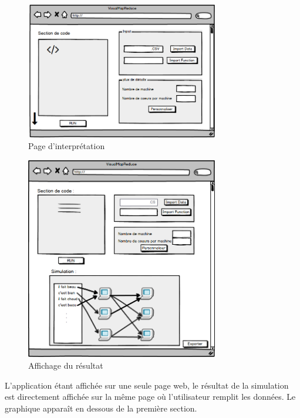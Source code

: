 \begin{figure}[H]
  \centering
    \includegraphics[width=0.75\textwidth]{images/interface/page_interpret1.png}
    \caption{Page d'interprétation}
    \label{fig:interface}
\end{figure}

\begin{figure}[H]
  \centering
    \includegraphics[width=0.75\textwidth]{images/interface/page_interpret2.png}
    \caption{Affichage du résultat}
    \label{fig:resultat}
\end{figure}

L'application étant affichée sur une seule page web, le résultat de la simulation est directement affichée sur la même page où l'utilisateur remplit les données. Le graphique apparaît en dessous de la première section.

